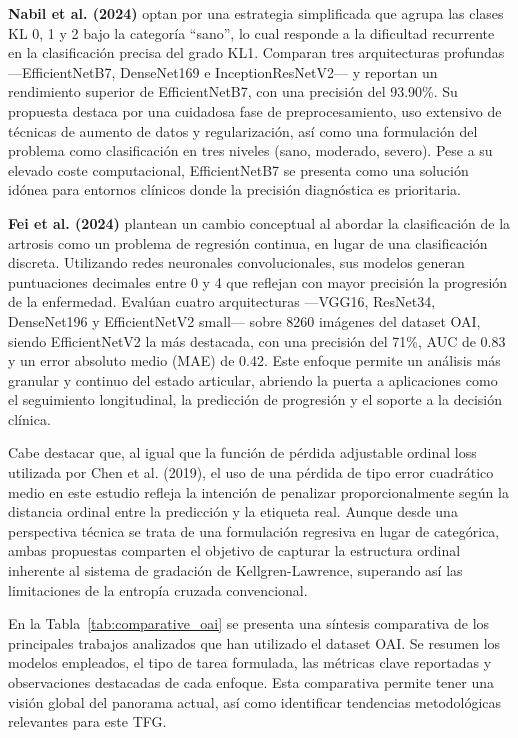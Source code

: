 \documentclass[11pt,spanish,listoffigures,listoftables]{tfgetsinf}
\begin{document}
\textbf{Nabil et al. (2024)} \cite{nabil2024automatic} optan por una estrategia simplificada que agrupa las clases KL 0, 1 y 2 bajo la categoría 
“sano”, lo cual responde a la dificultad recurrente en la clasificación precisa del grado KL1. Comparan tres arquitecturas profundas 
—EfficientNetB7, DenseNet169 e InceptionResNetV2— y reportan un rendimiento superior de EfficientNetB7, con una precisión del 93.90\%. 
Su propuesta destaca por una cuidadosa fase de preprocesamiento, uso extensivo de técnicas de aumento de datos y regularización, así 
como una formulación del problema como clasificación en tres niveles (sano, moderado, severo). Pese a su elevado coste computacional, 
EfficientNetB7 se presenta como una solución idónea para entornos clínicos donde la precisión diagnóstica es prioritaria.

\textbf{Fei et al. (2024)} \cite{fei2024diagnosing} plantean un cambio conceptual al abordar la clasificación de la artrosis como un problema 
de regresión continua, en lugar de una clasificación discreta. Utilizando redes neuronales convolucionales, sus modelos generan puntuaciones 
decimales entre 0 y 4 que reflejan con mayor precisión la progresión de la enfermedad. Evalúan cuatro arquitecturas —VGG16, ResNet34, 
DenseNet196 y EfficientNetV2 small— sobre 8260 imágenes del dataset OAI, siendo EfficientNetV2 la más destacada, con una precisión del 71\%, 
AUC de 0.83 y un error absoluto medio (MAE) de 0.42. Este enfoque permite un análisis más granular y continuo del estado articular, abriendo 
la puerta a aplicaciones como el seguimiento longitudinal, la predicción de progresión y el soporte a la decisión clínica.

Cabe destacar que, al igual que la función de pérdida adjustable ordinal loss utilizada por Chen et al. (2019), el uso de una pérdida de tipo 
error cuadrático medio en este estudio refleja la intención de penalizar proporcionalmente según la distancia ordinal entre la predicción y 
la etiqueta real. Aunque desde una perspectiva técnica se trata de una formulación regresiva en lugar de categórica, ambas propuestas comparten 
el objetivo de capturar la estructura ordinal inherente al sistema de gradación de Kellgren-Lawrence, superando así las limitaciones de la entropía 
cruzada convencional.

En la Tabla~\ref{tab:comparative_oai} se presenta una síntesis comparativa de los principales trabajos analizados que han utilizado el dataset OAI. 
Se resumen los modelos empleados, el tipo de tarea formulada, las métricas clave reportadas y observaciones destacadas de cada enfoque. Esta 
comparativa permite tener una visión global del panorama actual, así como identificar tendencias metodológicas relevantes para este TFG.
\end{document}
